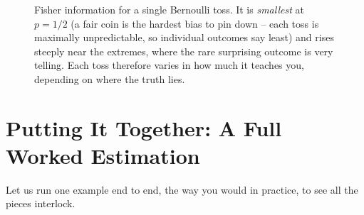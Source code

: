 \begin{figure}[H]
\centering
{}
\caption{Fisher information for a single Bernoulli toss. It is \emph{smallest} at
$p=1/2$ (a fair coin is the hardest bias to pin down -- each toss is maximally
unpredictable, so individual outcomes say least) and rises steeply near the
extremes, where the rare surprising outcome is very telling. Each toss therefore
varies in how much it teaches you, depending on where the truth lies.}
\label{ch30:fig-fisher-bern}
\end{figure}

\section{Putting It Together: A Full Worked Estimation}
\label{ch30:worked}

Let us run one example end to end, the way you would in practice, to see all the
pieces interlock.

